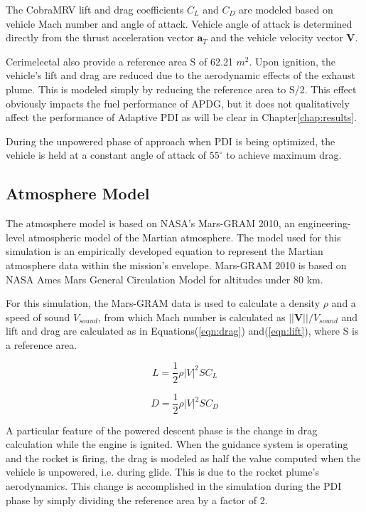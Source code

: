 The CobraMRV lift and drag coefficients $C_L$ and $C_D$ are modeled based on vehicle Mach number and angle of attack. Vehicle angle of attack is determined directly from the thrust acceleration vector $\bm{a}_T$ and the vehicle velocity vector $\bm{V}$.

Cerimele\:et\:al also provide a reference area S of 62.21 $m^2$. Upon ignition, the vehicle's lift and drag are reduced due to the aerodynamic effects of the exhaust plume. This is modeled simply by reducing the reference area to S/2. This effect obviously impacts the fuel performance of APDG, but it does not qualitatively affect the performance of Adaptive PDI as will be clear in Chapter\:\ref{chap:results}.

During the unpowered phase of approach when PDI is being optimized, the vehicle is held at a constant angle of attack of $55^{\circ}$ to achieve maximum drag. 

\subsection{Atmosphere Model}
The atmosphere model is based on NASA's Mars-GRAM 2010\:\cite{MARSGRAM}, an engineering-level atmospheric model of the Martian atmosphere. The model used for this simulation is an empirically developed equation to represent the Martian atmosphere data within the mission's envelope. Mars-GRAM 2010 is based on NASA Ames Mars General Circulation Model for altitudes under 80 km.

For this simulation, the Mars-GRAM data is used to calculate a density $\rho$ and a speed of sound $V_{sound}$, from which Mach number is calculated as $||\bm{V}||/V_{sound}$ and lift and drag are calculated as in Equations\:(\ref{eqn:drag}) and\:(\ref{eqn:lift}), where S is a reference area.


\begin{equation}
\label{eqn:lift}
L = \frac{1}{2} \rho |V|^2 S C_L
\end{equation}

\begin{equation}
\label{eqn:drag}
D = \frac{1}{2} \rho |V|^2 S C_D
\end{equation}

A particular feature of the powered descent phase is the change in drag calculation while the engine is ignited. When the guidance system is operating and the rocket is firing, the drag is modeled as half the value computed when the vehicle is unpowered, i.e. during glide. This is due to the rocket plume's aerodynamics. This change is accomplished in the simulation during the PDI phase by simply dividing the reference area by a factor of 2. 

